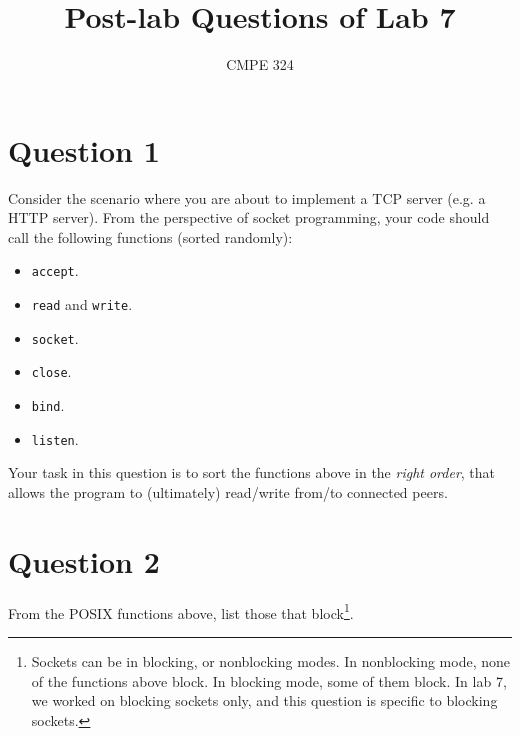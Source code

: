 \documentclass{article}
\title{Post-lab Questions of Lab 7}
\author{CMPE 324}
\begin{document}
    \maketitle
    \section{Question 1}
        Consider the scenario where you are about to implement a TCP server
        (e.g. a HTTP server). From the perspective of socket programming, your
        code should call the following functions (sorted randomly):
        \begin{itemize}
            \item \texttt{accept}.
            \item \texttt{read} and \texttt{write}.
            \item \texttt{socket}.
            \item \texttt{close}.
            \item \texttt{bind}.
            \item \texttt{listen}.
        \end{itemize}

        Your task in this question is to sort the functions above in the
        \emph{right order}, that allows the program to (ultimately) read/write
        from/to connected peers.

    \section{Question 2}
        From the POSIX functions above, list those that block\footnote{Sockets
        can be in blocking, or nonblocking modes. In nonblocking mode, none of
        the functions above block. In blocking mode, some of them block. In lab
        7, we worked on blocking sockets only, and this question is specific to
        blocking sockets.}.

    \newpage
    \appendix
\end{document}
